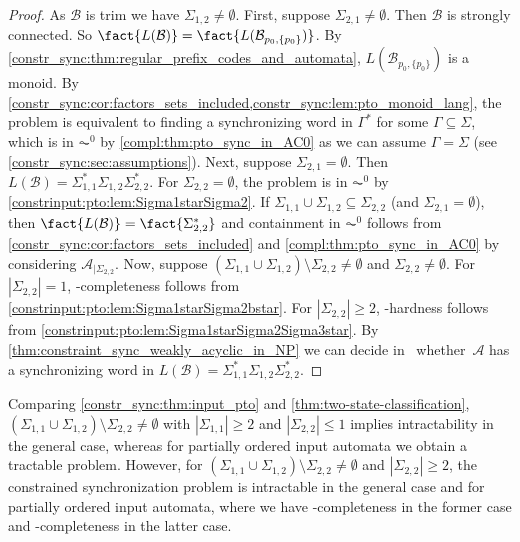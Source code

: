 \begin{proof} 
	As $\mathcal B$ is trim we have $\Sigma_{1,2} \ne \emptyset$.
	First, suppose $\Sigma_{2,1} \ne \emptyset$.
	Then $\mathcal B$
	is strongly connected.
	So $\fact{L(\mathcal B)} = \fact{L( \mathcal B_{p_0,\{p_0\}} )}$.
	By \cref{constr_sync:thm:regular_prefix_codes_and_automata}, 
	$L( \mathcal B_{p_0,\{p_0\}} )$ is a monoid.
	By \cref{constr_sync:cor:factors_sets_included,constr_sync:lem:pto_monoid_lang},
	the problem is equivalent 
    to finding a synchronizing word in $\Gamma^*$ for some $\Gamma \subseteq \Sigma$,
    which is in $\AC^0$ by \cref{compl:thm:pto_sync_in_AC0}
    as we can assume $\Gamma = \Sigma$ (see \cref{constr_sync:sec:assumptions}).
	Next, suppose $\Sigma_{2,1} = \emptyset$.
	Then $L(\mathcal B) = \Sigma_{1,1}^* \Sigma_{1,2} \Sigma_{2,2}^*$.
	For $\Sigma_{2,2} = \emptyset$,
	the problem is in $\AC^0$ by \cref{constrinput:pto:lem:Sigma1starSigma2}.
	If $\Sigma_{1,1} \cup \Sigma_{1,2} \subseteq \Sigma_{2,2}$ (and $\Sigma_{2,1}= \emptyset$),
	then $\fact{L(\mathcal B)} = \fact{\Sigma_{2,2}^*}$
	and containment in $\AC^0$ follows from \cref{constr_sync:cor:factors_sets_included} 
	and \cref{compl:thm:pto_sync_in_AC0}
	by considering $\mathcal A_{|\Sigma_{2,2}}$.
	Now, suppose $(\Sigma_{1,1} \cup \Sigma_{1,2}) \setminus \Sigma_{2,2} \ne \emptyset$
	and $\Sigma_{2,2} \ne \emptyset$.
	For $|\Sigma_{2,2}| = 1$,
	\LOGSPACE-completeness follows from \cref{constrinput:pto:lem:Sigma1starSigma2bstar}.	
	For $|\Sigma_{2,2}| \ge 2$,
	\NP-hardness follows from \cref{constrinput:pto:lem:Sigma1starSigma2Sigma3star}.
    By \cref{thm:constraint_sync_weakly_acyclic_in_NP} 
    we can decide in \NP\  whether~$\mathcal A$ has a synchronizing word in 
    $
    L(\mathcal B) = \Sigma_{1,1}^* \Sigma_{1,2} \Sigma_{2,2}^*.
    $	
\end{proof}

Comparing \cref{constr_sync:thm:input_pto} and \cref{thm:two-state-classification}, 
$( \Sigma_{1,1} \cup \Sigma_{1,2} ) \setminus \Sigma_{2,2} \ne \emptyset$
with $|\Sigma_{1,1}| \ge 2$ and $|\Sigma_{2,2}| \le 1$
implies intractability in the general case, whereas
for partially ordered input automata
we obtain a tractable problem. However, for 
$( \Sigma_{1,1} \cup \Sigma_{1,2} ) \setminus \Sigma_{2,2} \ne \emptyset$
and $|\Sigma_{2,2}| \ge 2$,
the constrained synchronization problem is intractable in the general case
and for partially ordered input automata, where we have \PSPACE-completeness
in the former case and \NP-completeness in the latter case.